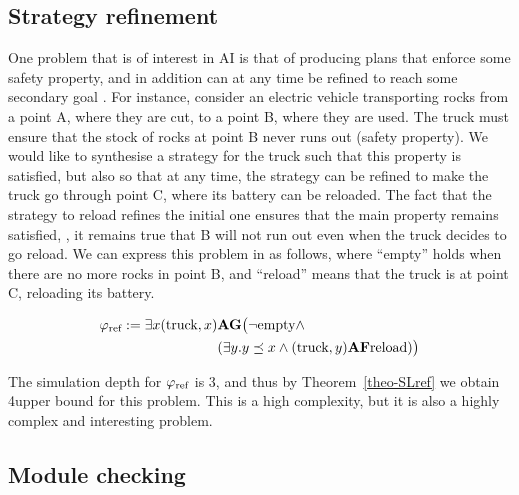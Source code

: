 \subsection{Strategy refinement}
\label{sec-plan-B}

One problem that is of interest in AI is
that of producing plans that enforce some safety property, and in addition
can at any time be refined to reach some secondary goal \cite{WrightMN18,PercassiG19}. For instance,
consider an electric vehicle transporting rocks from a point A, where
they are cut, to a point B, where they are used. The truck must ensure
that the stock of rocks at point B never runs out (safety property). We would like to synthesise a
strategy for the truck such that  this property is satisfied, but also
so that at any time, the strategy can be refined  to make the truck go
through point C, where its battery can be reloaded. The fact that the
strategy to reload refines the initial one ensures that the main
property remains satisfied, \ie, it remains true that B will not run
out even when the truck decides to go reload.
We can express  this problem in \SLref as follows, where ``empty''
holds when there are no more rocks in point B, and ``reload'' means
that the truck is at point C, reloading its battery.

\begin{align*}
\varphi_{\text{ref}}:=\exists x (\text{truck},x) & {\bf A} {\bf G} \big ( \neg
                                              \text{empty} \wedge \\
&  (\exists y. y\preceq x \wedge (\text{truck},y){\bf A}{\bf F} \text{reload}) \big )  
\end{align*}

The simulation depth for $\varphi_{\text{ref}}$ is 3, and thus by
Theorem~\ref{theo-SLref} we obtain 4\EXPTIME upper bound for this
problem. This is a high complexity, but it is also a highly complex
and interesting problem.

\subsection{Module checking}
\label{section:module}







